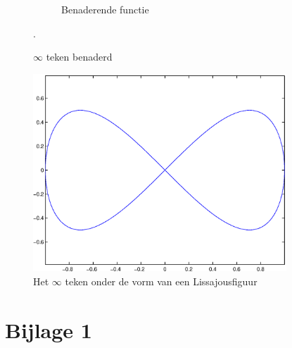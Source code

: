 \documentclass[a4paper]{article}
\begin{document}
\begin{figure}
\begin{subfigure}[b]{0.4\textwidth}
        \caption{Benaderende functie}
        \label{fig:periotrigb}
    \end{subfigure}
    \hfill
    \caption{$\infty$ teken benaderd}\label{fig:periotrigclick}.
\end{figure}
\begin{figure}
        \centering
        \includegraphics[width=0.85\textwidth]{lissajous.eps}
        \caption{Het $\infty$ teken onder de vorm van een Lissajousfiguur}
        \label{fig:lissajous}
    \end{figure}
\newpage
\section*{Bijlage 1} 

\label{bijlage1}
\end{document}

